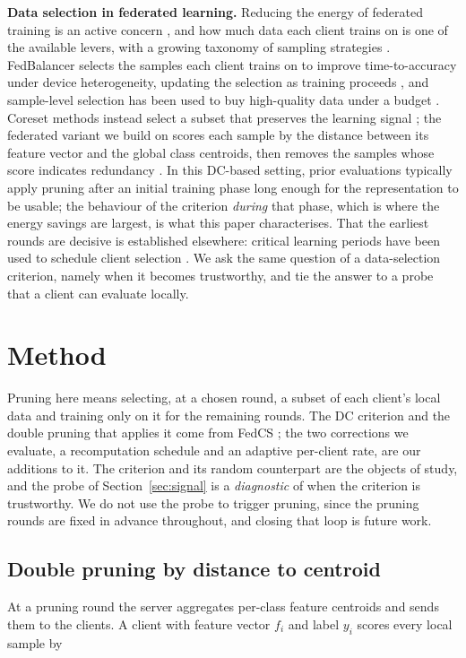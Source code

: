 \documentclass[conference]{IEEEtran}
\begin{document}
\textbf{Data selection in federated learning.} Reducing the energy of federated
training is an active concern \cite{greenfl}, and how much data each client trains on
is one of the available levers, with a growing taxonomy of sampling strategies
\cite{sampling}. FedBalancer selects the samples each client trains on to improve
time-to-accuracy under device heterogeneity, updating the selection as training
proceeds \cite{fedbalancer}, and sample-level selection has been used to buy
high-quality data under a budget \cite{sampleselect}. Coreset methods instead select a
subset that preserves the learning signal \cite{coreset}; the federated variant we
build on scores each sample by the distance between its feature vector and the global
class centroids, then removes the samples whose score indicates redundancy
\cite{fedcs}. In this DC-based setting, prior evaluations typically apply pruning
after an initial training phase long enough for the representation to be usable; the
behaviour of the criterion \emph{during} that phase, which is where the energy savings
are largest, is what this paper characterises. That the earliest rounds are decisive
is established elsewhere: critical learning periods have been used to schedule client
selection \cite{criticalfl}. We ask the same question of a data-selection criterion,
namely when it becomes trustworthy, and tie the answer to a probe that a client can
evaluate locally.

\section{Method}

Pruning here means selecting, at a chosen round, a subset of each client's local data
and training only on it for the remaining rounds. The DC criterion and the double
pruning that applies it come from FedCS \cite{fedcs}; the two corrections we evaluate,
a recomputation schedule and an adaptive per-client rate, are our additions to it. The criterion and
its random counterpart are the objects of study, and the probe of
Section~\ref{sec:signal} is a \emph{diagnostic} of when the criterion is trustworthy.
We do not use the probe to trigger pruning, since the pruning rounds are fixed in
advance throughout, and closing that loop is future work.



\subsection{Double pruning by distance to centroid}
At a pruning round the server aggregates per-class feature centroids and sends them
to the clients. A client with feature vector $f_i$ and label $y_i$ scores every local
sample by
\end{document}
